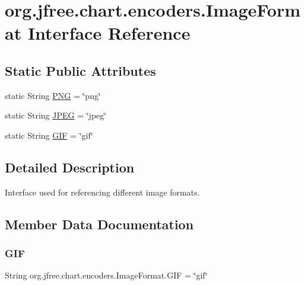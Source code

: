 \hypertarget{interfaceorg_1_1jfree_1_1chart_1_1encoders_1_1_image_format}{}\section{org.\+jfree.\+chart.\+encoders.\+Image\+Format Interface Reference}
\label{interfaceorg_1_1jfree_1_1chart_1_1encoders_1_1_image_format}
\subsection*{Static Public Attributes}
\begin{DoxyCompactItemize}
\item 
static String \mbox{\hyperlink{interfaceorg_1_1jfree_1_1chart_1_1encoders_1_1_image_format_ab5d0502b4c352b4aaea670ca202c9bf7}{P\+NG}} = \char`\"{}png\char`\"{}
\item 
static String \mbox{\hyperlink{interfaceorg_1_1jfree_1_1chart_1_1encoders_1_1_image_format_add5d4321a9d0e25fa24cfb8c84fe67eb}{J\+P\+EG}} = \char`\"{}jpeg\char`\"{}
\item 
static String \mbox{\hyperlink{interfaceorg_1_1jfree_1_1chart_1_1encoders_1_1_image_format_a5ddb7ac43cbb23f2d4d49aedf5bd2821}{G\+IF}} = \char`\"{}gif\char`\"{}
\end{DoxyCompactItemize}


\subsection{Detailed Description}
Interface used for referencing different image formats. 

\subsection{Member Data Documentation}
\mbox{\label{interfaceorg_1_1jfree_1_1chart_1_1encoders_1_1_image_format_a5ddb7ac43cbb23f2d4d49aedf5bd2821}} 
\subsubsection{\texorpdfstring{G\+IF}{GIF}}
{\footnotesize\ttfamily String org.\+jfree.\+chart.\+encoders.\+Image\+Format.\+G\+IF = \char`\"{}gif\char`\"{}\hspace{0.3cm}{\ttfamily [static]}}

